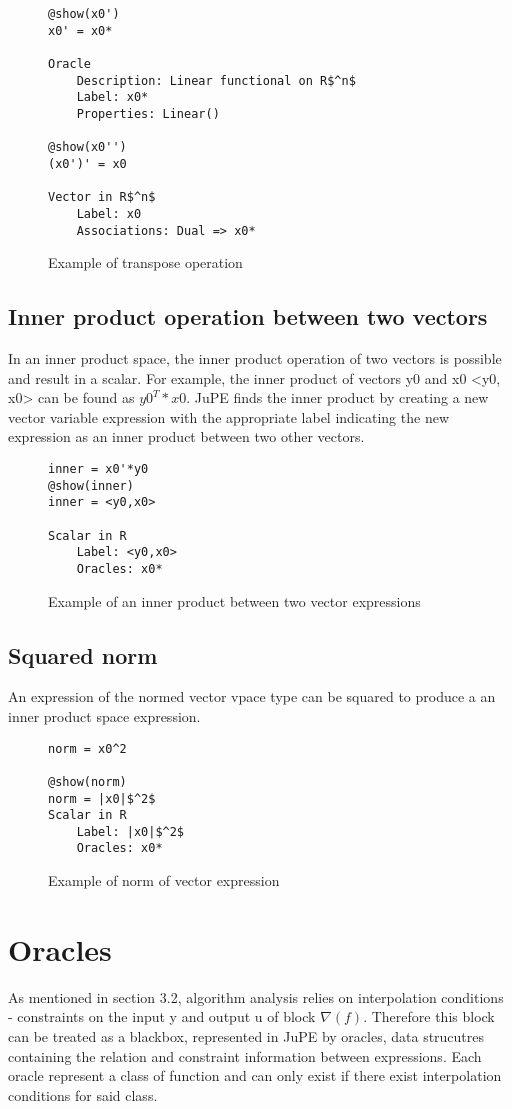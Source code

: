 \begin{figure}[!h]
	\begin{lstlisting}[mathescape]
@show(x0')
x0' = x0*

Oracle
	Description: Linear functional on R$^n$
	Label: x0*
	Properties: Linear()

@show(x0'')
(x0')' = x0

Vector in R$^n$
	Label: x0
	Associations: Dual => x0*
	\end{lstlisting}
	\caption{Example of transpose operation}
	\label{ex_transpose}
\end{figure}

\subsection*{Inner product operation between two vectors}
In an inner product space, the inner product operation of two vectors is possible and result in a scalar. For example, the inner product of vectors y0 and x0 <y0, x0> can be found as $y0^T * x0$. JuPE finds the inner product by creating a new vector variable expression with the appropriate label indicating the new expression as an inner product between two other vectors.
\begin{figure}[!h]
	\begin{lstlisting}[mathescape]
inner = x0'*y0
@show(inner)
inner = <y0,x0>

Scalar in R
	Label: <y0,x0>
	Oracles: x0*

	\end{lstlisting}
	\caption{Example of an inner product between two vector expressions}
	\label{ex_inner}
\end{figure}

\subsection*{Squared norm}
An expression of the normed vector vpace type can be squared to produce a an inner product space expression.
\begin{figure}[!h]
	\begin{lstlisting}[mathescape]
norm = x0^2

@show(norm)
norm = |x0|$^2$
Scalar in R
	Label: |x0|$^2$
	Oracles: x0*
\end{lstlisting}
\caption{Example of norm of vector expression}
\label{ex_norm}
\end{figure}

\section{Oracles}
As mentioned in section 3.2, algorithm analysis relies on interpolation conditions - constraints on the input y and output u of block \( \nabla (f) \). Therefore this block can be treated as a blackbox,  represented in JuPE by oracles, data strucutres containing the relation and constraint information between expressions. Each oracle represent a class of function and can only exist if there exist interpolation conditions for said class.

